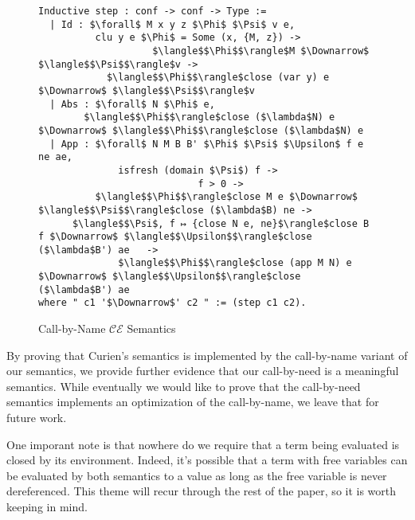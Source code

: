 \begin{figure}
\begin{lstlisting}
Inductive step : conf -> conf -> Type :=
  | Id : $\forall$ M x y z $\Phi$ $\Psi$ v e, 
          clu y e $\Phi$ = Some (x, {M, z}) -> 
                    $\langle$$\Phi$$\rangle$M $\Downarrow$ $\langle$$\Psi$$\rangle$v ->
            $\langle$$\Phi$$\rangle$close (var y) e $\Downarrow$ $\langle$$\Psi$$\rangle$v
  | Abs : $\forall$ N $\Phi$ e, 
        $\langle$$\Phi$$\rangle$close ($\lambda$N) e $\Downarrow$ $\langle$$\Phi$$\rangle$close ($\lambda$N) e
  | App : $\forall$ N M B B' $\Phi$ $\Psi$ $\Upsilon$ f e ne ae, 
              isfresh (domain $\Psi$) f -> 
                            f > 0 ->
          $\langle$$\Phi$$\rangle$close M e $\Downarrow$ $\langle$$\Psi$$\rangle$close ($\lambda$B) ne -> 
      $\langle$$\Psi$, f ↦ {close N e, ne}$\rangle$close B f $\Downarrow$ $\langle$$\Upsilon$$\rangle$close ($\lambda$B') ae   ->
              $\langle$$\Phi$$\rangle$close (app M N) e $\Downarrow$ $\langle$$\Upsilon$$\rangle$close ($\lambda$B') ae
where " c1 '$\Downarrow$' c2 " := (step c1 c2).
\end{lstlisting}
\caption{Call-by-Name $\mathcal{CE}$ Semantics}
\label{fig:bigstepname}
\end{figure}

By proving that Curien's semantics is implemented by the call-by-name variant of
our semantics, we provide further evidence that our call-by-need is a
meaningful semantics. While eventually we would like to prove that the
call-by-need semantics implements an optimization of the call-by-name, we leave
that for future work.

One imporant note is that nowhere do we require that a term being evaluated is
closed by its environment. Indeed, it's possible that a term with free variables
can be evaluated by both semantics to a value as long as the free variable is
never dereferenced. This theme will recur through the rest of the paper, so it
is worth keeping in mind.  
